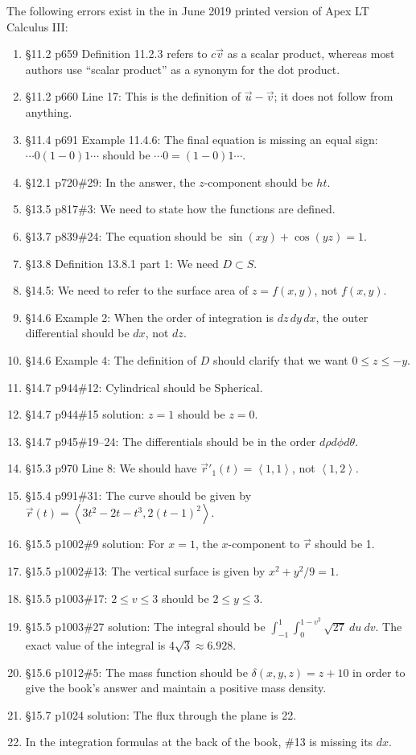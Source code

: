 \documentclass{amsart}
\newcommand{\bracket}[1]{\left\langle#1\right\rangle}
\begin{document}
The following errors exist in the in June 2019 printed version of Apex LT Calculus III:
\begin{enumerate}
\item \S11.2 p659 Definition 11.2.3 refers to $c\vec v$ as a scalar product, whereas most authors use ``scalar product'' as a synonym for the dot product.
\item \S11.2 p660 Line 17: This is the definition of $\vec u-\vec v$; it does not follow from anything.
\item \S11.4 p691 Example 11.4.6: The final equation is missing an equal sign: $\dotsm0(1-0)1\dotsb$ should be $\dotsm0=(1-0)1\dotsb$.
\item \S12.1 p720\#29: In the answer, the $z$-component should be $ht$.
\item \S13.5 p817\#3: We need to state how the functions are defined.
\item \S13.7 p839\#24: The equation should be $\sin(xy)+\cos(yz)=1$.
\item \S13.8 Definition 13.8.1 part 1: We need $D\subset S$.
\item \S14.5: We need to refer to the surface area of $z=f(x,y)$, not $f(x,y)$.
\item \S14.6 Example 2: When the order of integration is $dz\,dy\,dx$, the outer differential should be $dx$, not $dz$.
\item \S14.6 Example 4: The definition of $D$ should clarify that we want $0\le z\le-y$.
\item \S14.7 p944\#12: Cylindrical should be Spherical.
\item \S14.7 p944\#15 solution: $z=1$ should be $z=0$.
\item \S14.7 p945\#19--24: The differentials should be in the order $d\rho d\phi d\theta$.
\item \S15.3 p970 Line 8: We should have $\vec r'_1(t)=\bracket{1,1}$, not $\bracket{1,2}$.
\item \S15.4 p991\#31: The curve should be given by $\vec r(t)=\bracket{3t^2-2t-t^3,2(t-1)^2}$.
\item \S15.5 p1002\#9 solution: For $x=1$, the $x$-component to $\vec r$ should be 1.
\item \S15.5 p1002\#13: The vertical surface is given by $x^2+y^2/9=1$.
\item \S15.5 p1003\#17: $2\le v\le3$ should be $2\le y\le3$.
\item \S15.5 p1003\#27 solution: The integral should be $\int_{-1}^1\int_0^{1-v^2}\sqrt{27}\ du\ dv$. The exact value of the integral is $4\sqrt3\approx6.928$.
\item \S15.6 p1012\#5: The mass function should be $\delta(x,y,z)=z+10$ in order to give the book's answer and maintain a positive mass density.
\item \S15.7 p1024 solution: The flux through the plane is 22.
\item In the integration formulas at the back of the book, \#13 is missing its $dx$.
\label{2019-06-00III}
\end{enumerate}
\end{document}
